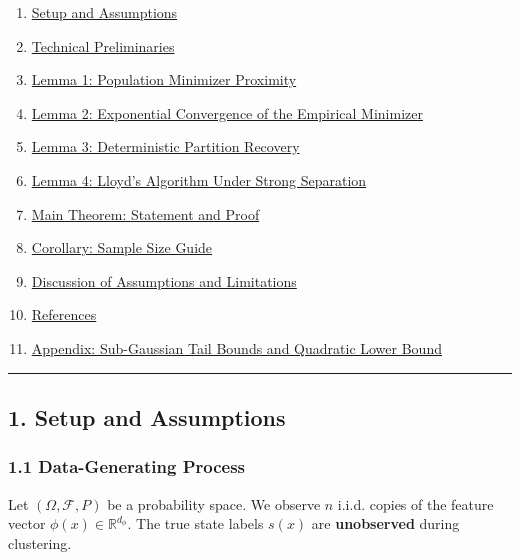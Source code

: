 \documentclass[
  12pt,
]{ctexart}
\providecommand{\tightlist}{%
  \setlength{\itemsep}{0pt}\setlength{\parskip}{0pt}}
\begin{document}
\begin{enumerate}
\def\labelenumi{\arabic{enumi}.}
\tightlist
\item
  \hyperref[1-setup-and-assumptions]{Setup and Assumptions}
\item
  \hyperref[2-technical-preliminaries]{Technical Preliminaries}
\item
  \hyperref[3-lemma-1-population-minimizer-proximity]{Lemma 1:
  Population Minimizer Proximity}
\item
  \hyperref[4-lemma-2-exponential-convergence-of-the-empirical-minimizer]{Lemma
  2: Exponential Convergence of the Empirical Minimizer}
\item
  \hyperref[5-lemma-3-deterministic-partition-recovery]{Lemma 3:
  Deterministic Partition Recovery}
\item
  \hyperref[6-lemma-4-lloyds-algorithm-under-strong-separation]{Lemma 4:
  Lloyd's Algorithm Under Strong Separation}
\item
  \hyperref[7-main-theorem-statement-and-proof]{Main Theorem: Statement
  and Proof}
\item
  \hyperref[8-corollary-sample-size-guide]{Corollary: Sample Size Guide}
\item
  \hyperref[9-discussion-of-assumptions-and-limitations]{Discussion of
  Assumptions and Limitations}
\item
  \hyperref[10-references]{References}
\item
  \hyperref[11-appendix-sub-gaussian-tail-bounds-and-quadratic-lower-bound]{Appendix:
  Sub-Gaussian Tail Bounds and Quadratic Lower Bound}
\end{enumerate}

\begin{center}\rule{0.5\linewidth}{0.5pt}\end{center}

\subsection{1. Setup and Assumptions}\label{setup-and-assumptions}

\subsubsection{1.1 Data-Generating
Process}\label{data-generating-process}

Let \((\Omega, \mathcal{F}, P)\) be a probability space. We observe
\(n\) i.i.d. copies of the feature vector
\(\phi(x) \in \mathbb{R}^{d_\phi}\). The true state labels \(s(x)\) are
\textbf{unobserved} during clustering.
\end{document}
